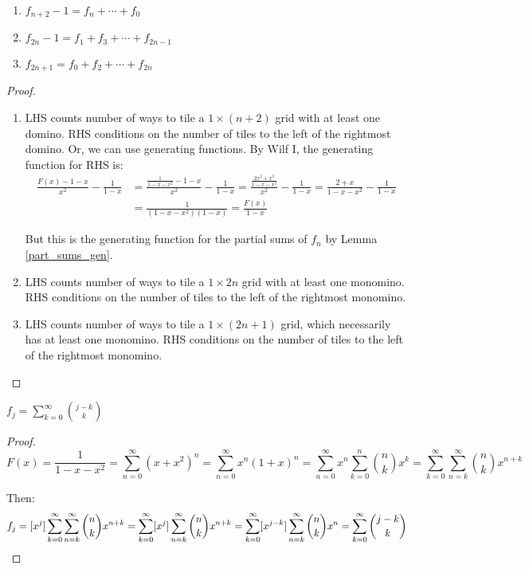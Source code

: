 \documentclass[a4paper]{article}
\begin{document}
\begin{lemma}
\;
\begin{enumerate}
\item $f_{n+2}-1=f_n+\cdots+f_0$
\item $f_{2n}-1=f_1+f_3+\cdots+f_{2n-1}$
\item $f_{2n+1}=f_{0}+f_2+\cdots+f_{2n}$
\end{enumerate}

\begin{hl}
\begin{proof}
\;
\begin{enumerate}
\item LHS counts number of ways to tile a $1\times(n+2)$ grid with at least one domino. RHS conditions on the number of tiles to the left of the rightmost domino. Or, we can use generating functions. By Wilf I, the generating function for RHS is:
\begin{align*}
\frac{F(x)-1-x}{x^2}-\frac1{1-x}
&=\frac{\frac1{1-x-x^2}-1-x}{x^2}-\frac1{1-x}
=\frac{\frac{2x^2+x^3}{1-x-x^2}}{x^2}-\frac1{1-x}
=\frac{2+x}{1-x-x^2}-\frac1{1-x}\\
&=\frac{1}{(1-x-x^2)(1-x)}
=\frac{F(x)}{1-x}
\end{align*}

But this is the generating function for the partial sums of $f_n$ by Lemma \ref{part_sums_gen}.
\item LHS counts number of ways to tile a $1\times 2n$ grid with at least one monomino. RHS conditions on the number of tiles to the left of the rightmost monomino.
\item LHS counts number of ways to tile a $1\times (2n+1)$ grid, which necessarily has at least one monomino. RHS conditions on the number of tiles to the left of the rightmost monomino.\qedhere
\end{enumerate}

\end{proof}
\end{hl}
\end{lemma}

\begin{lemma}
$f_j=\sum_{k=0}^\infty\binom{j-k}k$

\begin{hl}
\begin{proof}
\begin{equation*}
F(x)
=\frac1{1-x-x^2}
=\sum_{n=0}^\infty(x+x^2)^n
=\sum_{n=0}^\infty x^n(1+x)^n
=\sum_{n=0}^\infty x^n\sum_{k=0}^n\binom nkx^k
=\sum_{k=0}^\infty\sum_{n=k}^\infty\binom nkx^{n+k}
\end{equation*}

Then:
\begin{equation*}
f_j
=[x^j]\sum_{k=0}^\infty\sum_{n=k}^\infty\binom nkx^{n+k}
=\sum_{k=0}^\infty[x^j]\sum_{n=k}^\infty\binom nkx^{n+k}
=\sum_{k=0}^\infty[x^{j-k}]\sum_{n=k}^\infty\binom nkx^n
=\sum_{k=0}^\infty\binom{j-k}k\qedhere
\end{equation*}
\end{proof}
\end{hl}
\end{lemma}
\end{document}
